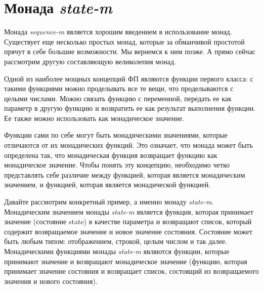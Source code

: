 \documentclass[a4paper,12pt]{article}
\newcommand{\cl}[1] {{\it #1}}
\begin{document}
\section{Монада \cl{state-m}}\label{more-power}
Монада \cl{sequence-m} является хорошим введением в использование монад. 
Существует еще несколько
простых монад, которые за обманчивой простотой прячут в себе большие возможности. Мы 
вернемся к ним позже. А прямо сейчас рассмотрим другую составляющую великолепия монад. %

Одной из наиболее мощных концепций ФП являются функции первого класса: с такими функциями
можно проделывать все те вещи, что проделываются с целыми числами. Можно связать 
функцию с переменной, передать ее как параметр в другую функцию и возвратить ее 
как результат выполнения функции. Ее также можно использовать как монадическое
значение.


Функции сами по себе могут быть монадическими значениями, которые отличаются от их монадических
функций. Это означает, что монада может быть определена так, что монадическая функция
возвращает функцию как монадическое значение. Чтобы понять эту концепцию, необходимо
четко представлять себе различие между функцией, которая является монадическим значением,
и функцией, которая является монадической функцией. 

Давайте рассмотрим конкретный пример, а именно монаду \cl{state-m}. Монадическим значением
монады \cl{state-m} является функция, которая принимает значение (состояние state) в качестве
параметра и возвращают список, который содержит возвращаемое значение и новое значение состояния. 
Состояние может быть любым типом: отображением, строкой, целым числом и так далее. Монадическими
функциями монады \cl{state-m} являются функции, которые принимают значение и возвращают монадическое
значение (функцию, которая принимает значение состояния и возвращает список, состоящий из 
возвращаемого значения и нового состояния). 
\end{document}
